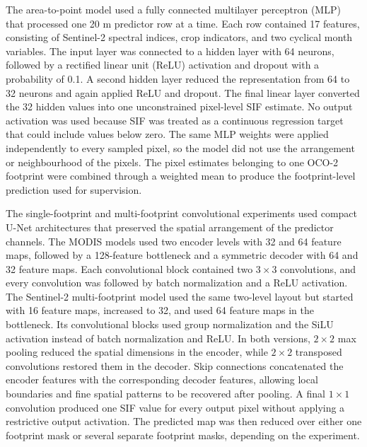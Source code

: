 The area-to-point model used a fully connected multilayer perceptron (MLP) that processed one 20 m predictor row at a time. Each row contained 17 features, consisting of Sentinel-2 spectral indices, crop indicators, and two cyclical month variables. The input layer was connected to a hidden layer with 64 neurons, followed by a rectified linear unit (ReLU) activation and dropout with a probability of 0.1. A second hidden layer reduced the representation from 64 to 32 neurons and again applied ReLU and dropout. The final linear layer converted the 32 hidden values into one unconstrained pixel-level SIF estimate. No output activation was used because SIF was treated as a continuous regression target that could include values below zero. The same MLP weights were applied independently to every sampled pixel, so the model did not use the arrangement or neighbourhood of the pixels. The pixel estimates belonging to one OCO-2 footprint were combined through a weighted mean to produce the footprint-level prediction used for supervision.

The single-footprint and multi-footprint convolutional experiments used compact U-Net architectures that preserved the spatial arrangement of the predictor channels. The MODIS models used two encoder levels with 32 and 64 feature maps, followed by a 128-feature bottleneck and a symmetric decoder with 64 and 32 feature maps. Each convolutional block contained two $3\times3$ convolutions, and every convolution was followed by batch normalization and a ReLU activation. The Sentinel-2 multi-footprint model used the same two-level layout but started with 16 feature maps, increased to 32, and used 64 feature maps in the bottleneck. Its convolutional blocks used group normalization and the SiLU activation instead of batch normalization and ReLU. In both versions, $2\times2$ max pooling reduced the spatial dimensions in the encoder, while $2\times2$ transposed convolutions restored them in the decoder. Skip connections concatenated the encoder features with the corresponding decoder features, allowing local boundaries and fine spatial patterns to be recovered after pooling. A final $1\times1$ convolution produced one SIF value for every output pixel without applying a restrictive output activation. The predicted map was then reduced over either one footprint mask or several separate footprint masks, depending on the experiment.


